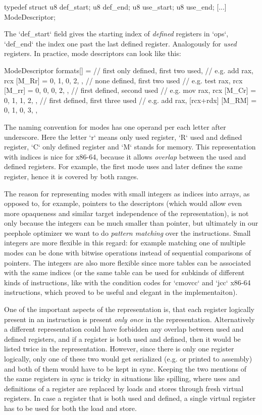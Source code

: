 \begtt
typedef struct {
	u8 def_start;
	u8 def_end;
	u8 use_start;
	u8 use_end;
	[...]
} ModeDescriptor;
\endtt

The `def_start` field gives the starting index of {\em defined} registers in `ops`,
`def_end` the index one past the last defined register. Analogously for {\em
used} registers. In practice, mode descriptors can look like this:

\begtt
ModeDescriptor formats[] = {
	// first only defined, first two used,
	// e.g. add rax, rcx
	[M_Rr] = { 0, 1, 0, 2, },
	// none defined, first two used
	// e.g. test rax, rcx
	[M_rr] = { 0, 0, 0, 2, },
	// first defined, second used
	// e.g. mov rax, rcx
	[M_Cr] = { 0, 1, 1, 2, },
	// first defined, first three used
	// e.g. add rax, [rcx+rdx]
	[M_RM] = { 0, 1, 0, 3, },
}
\endtt

The naming convention for modes has one operand per each letter after
underscore. Here the letter `r` means only used register, `R` used and defined register,
`C` only defined register and `M` stands for memory. This representation with
indices is nice for x86-64, because it allows {\em overlap} between the used and
defined registers. For example, the first mode uses and later defines the same
register, hence it is covered by both ranges.

The reason for representing modes with small integers as indices into arrays, as
opposed to, for example, pointers to the descriptors (which would allow even
more opaqueness and similar target independence of the representation), is
not only because the integers can be much smaller than pointer, but ultimately
in our peephole optimizer we want to do {\em pattern matching} over the
instructions. Small integers are more flexible in this regard: for
example matching one of multiple modes can be done with bitwise operations
instead of sequential comparisons of pointers. The integers are also more
flexible since more tables can be associated with the same indices (or the same
table can be used for subkinds of different kinds of instructions, like with the
condition codes for `cmovcc` and `jcc` x86-64 instructions, which proved to be
useful and elegant in the implementaiton).

One of the important aspects of the representation is, that each register
logically present in an instruction is present {\em only once} in the
representation. Alternatively a different representation could have forbidden
any overlap between used and defined registers, and if a register is both used
and defined, then it would be listed twice in the representation. However, since
there is only one register logically, only one of these two would get serialized
(e.g. or printed to assembly) and both of them would have to be kept in sync.
Keeping the two mentions of the same registers in sync is tricky in situations
like spilling, where uses and definitions of a register are replaced by loads
and stores through fresh virtual registers. In case a register that is both
used and defined, a single virtual register has to be used for both the load and
store.

